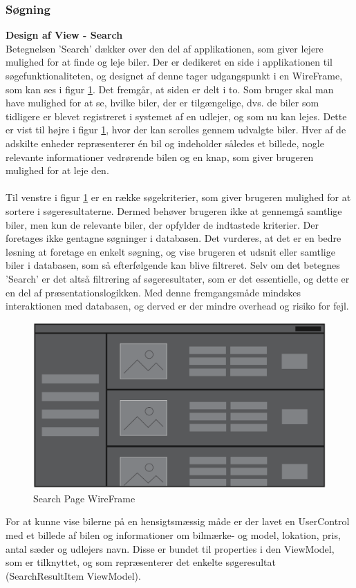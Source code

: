 \documentclass[Rapport/Rapport_main.tex]{subfiles}
\begin{document}
\subsubsection{Søgning}
\textbf{Design af View - Search}\\
Betegnelsen 'Search' dækker over den del af applikationen, som giver lejere mulighed for at finde og leje biler. Der er dedikeret en side i applikationen til søgefunktionaliteten, og designet af denne tager udgangspunkt i en WireFrame, som kan ses i figur \ref{fig:search_wireframe}. Det fremgår, at siden er delt i to. Som bruger skal man have mulighed for at se, hvilke biler, der er tilgængelige, dvs. de biler som tidligere er blevet registreret i systemet af en udlejer, og som nu kan lejes. Dette er vist til højre i figur \ref{fig:search_wireframe}, hvor der kan scrolles gennem udvalgte biler. Hver af de adskilte enheder repræsenterer én bil og indeholder således et billede, nogle relevante informationer vedrørende bilen og en knap, som giver brugeren mulighed for at leje den. \\\\Til venstre i figur \ref{fig:search_wireframe} er en række søgekriterier, som giver brugeren mulighed for at sortere i søgeresultaterne. Dermed behøver brugeren ikke at gennemgå samtlige biler, men kun de relevante biler, der opfylder de indtastede kriterier. Der foretages ikke gentagne søgninger i databasen. Det vurderes, at det er en bedre løsning at foretage en enkelt søgning, og vise brugeren et udsnit eller samtlige biler i databasen, som så efterfølgende kan blive filtreret. Selv om det betegnes 'Search' er det altså filtrering af søgeresultater, som er det essentielle, og dette er en del af præsentationslogikken. Med denne fremgangsmåde mindskes interaktionen med databasen, og derved er der mindre overhead og risiko for fejl.
\begin{figure}[H]
    \centering
    \includegraphics[width=\textwidth]{SoftwareDesign/MVVMDesigns/Graphics/SearchWireFrame.png}
    \caption{Search Page WireFrame}
    \label{fig:search_wireframe}
\end{figure}
For at kunne vise bilerne på en hensigtsmæssig måde er der lavet en UserControl med et billede af bilen og informationer om bilmærke- og model, lokation, pris, antal sæder og udlejers navn. Disse er bundet til properties i den ViewModel, som er tilknyttet, og som repræsenterer det enkelte søgeresultat (SearchResultItem ViewModel).
\end{document}
